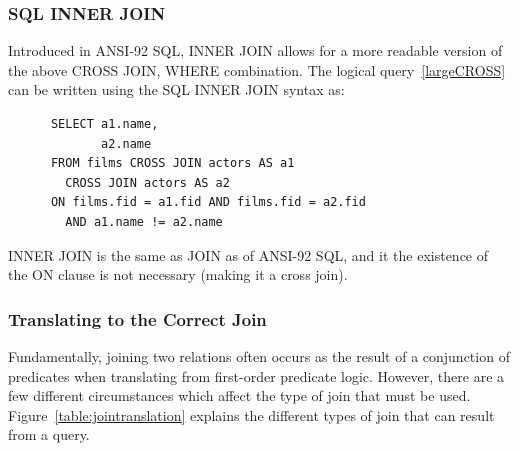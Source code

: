 \documentclass[a4paper, 11pt]{article}
\begin{document}

    \subsubsection{SQL INNER JOIN}

      Introduced in ANSI-92 SQL, INNER JOIN allows for a more readable version of
      the above CROSS JOIN, WHERE combination. The logical query~\ref{largeCROSS}
      can be written using the SQL INNER JOIN syntax as:

      \begin{verbatim}
      SELECT a1.name,
             a2.name
      FROM films CROSS JOIN actors AS a1
        CROSS JOIN actors AS a2
      ON films.fid = a1.fid AND films.fid = a2.fid 
        AND a1.name != a2.name
      \end{verbatim}

      INNER JOIN is the same as JOIN as of ANSI-92 SQL, and it the existence of
      the ON clause is not necessary (making it a cross join).

    \subsubsection{Translating to the Correct Join}

      Fundamentally, joining two relations often occurs as the result of a
      conjunction of predicates when translating from first-order predicate
      logic. However, there are a few different circumstances which affect the
      type of join that must be used. Figure~\ref{table:jointranslation} explains
      the different types of join that can result from a query.

      \newcommand*{\tabbox}[2][t]{%
            \centering\vspace{0pt}\parbox[#1][3.7\baselineskip]{6.5cm}{\strut#2\strut}}
\end{document}
